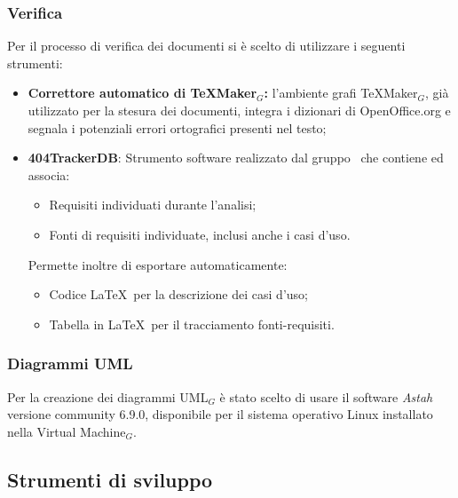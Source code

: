 \subsubsection{Verifica}
Per il processo di verifica dei documenti si è scelto di utilizzare i seguenti strumenti:
\begin{itemize}

\item \textbf{Correttore automatico di TeXMaker$_G$:} l'ambiente grafi TeXMaker$_G$, già utilizzato per la stesura dei documenti, integra i dizionari di OpenOffice.org e segnala i potenziali errori ortografici presenti nel testo;

\item \textbf{404TrackerDB}: Strumento software realizzato dal gruppo \gruppo\ che contiene ed associa:
	\begin{itemize}
		\item Requisiti individuati durante l'analisi;
		\item Fonti di requisiti individuate, inclusi anche i casi d'uso.
	\end{itemize}
	Permette inoltre di esportare automaticamente:
	\begin{itemize}
		\item Codice \LaTeX\ per la descrizione dei casi d'uso;
		\item Tabella in \LaTeX\ per il tracciamento fonti-requisiti.
	\end{itemize}

\end{itemize}
\subsubsection{Diagrammi UML}
Per la creazione dei diagrammi UML$_G$ è stato scelto di usare il software \textit{Astah} versione community 6.9.0, disponibile per il sistema operativo Linux installato nella Virtual Machine$_G$.

\subsection{Strumenti di sviluppo}

